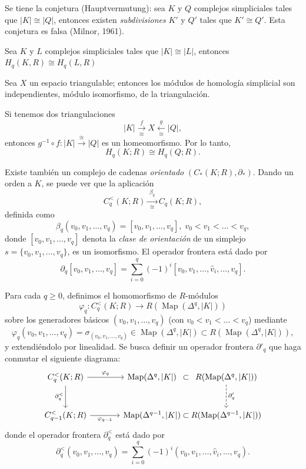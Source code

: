 Se tiene la conjetura (Hauptvermutung): sea $K$ y $Q$ complejos simpliciales tales que $|K|\cong |Q|$, entonces existen \textit{subdivisiones} $K'$ y $Q'$ tales que $K'\cong Q'$. Esta conjetura es falsa (Milnor, 1961).

\begin{teorema}[S.W.Alexander, 1915]
Sea $K$ y $L$ complejos simpliciales tales que $|K|\cong |L|$, entonces $H_q(K,R)\cong H_q(L,R)$ %
\end{teorema}
\begin{coro}
Sea $X$ un espacio triangulable; entonces los módulos de homología simplicial son independientes, módulo isomorfismo, de la triangulación.
\end{coro}

\begin{dem}
Si tenemos dos triangulaciones
\[
|K| \xrightarrow[\;\cong\;]{\;f\;} X \xleftarrow[\;\cong\;]{\;g\;} |Q|,
\]
entonces $g^{-1} \circ f \colon |K| \xrightarrow{\;\cong\;} |Q|$ es un homeomorfismo. Por lo tanto,
\[
H_q(K; R) \cong H_q(Q; R).
\]
\end{dem}
\begin{nota}
Existe también un complejo de cadenas \textit{orientado} $(C_*(K; R), \partial_*)$. Dando un orden a $K$, se puede ver que la aplicación
\[
C_q^<(K; R) \xrightarrow[\;\cong\;]{\;\beta_q\;} C_q(K; R),
\]
definida como
\[
\beta_q(v_0, v_1, \dots, v_q) = [v_0, v_1, \dots, v_q], \; v_0 < v_1 < \dots < v_q,
\]
donde $[v_0, v_1, \dots, v_q]$ denota la \textit{clase de orientación} de un simplejo $s = \{v_0, v_1, \dots, v_q\}$, es un isomorfismo. El operador frontera está dado por
\[
\partial_q[v_0, v_1, \dots, v_q] = \sum_{i=0}^q (-1)^i [v_0, v_1, \dots, \hat{v}_i, \dots, v_q].
\]
\end{nota}
\begin{definicion}
Para cada $q \geq 0$, definimos el homomorfismo de $R$-módulos
\[
\varphi_q \colon C_q^<(K; R) \longrightarrow R(\operatorname{Map}(\Delta^q, |K|))
\]
sobre los generadores básicos $(v_0, v_1, \dots, v_q)$ (con $v_0 < v_1 < \dots < v_q$) mediante
\[
\varphi_q(v_0, v_1, \dots, v_q) = \sigma_{(v_0, v_1, \dots, v_q)} \in \operatorname{Map}(\Delta^q, |K|) \subset R(\operatorname{Map}(\Delta^q, |K|)),
\]
y extendiéndolo por linealidad. Se busca definir un operador frontera $\partial'_q$ que haga conmutar el siguiente diagrama:
\[
\begin{tikzcd}[row sep=large, column sep=large]
C_q^<(K; R) \arrow[r, "\varphi_q"] \arrow[d, "\partial_q^<"'] & \operatorname{Map}(\Delta^q, |K|) \arrow[r, phantom, "\subset"] &[-3.2em] R(\operatorname{Map}(\Delta^q, |K|)) \arrow[d, "\partial'_q", dashed] \\
C_{q-1}^<(K; R) \arrow[r, "\varphi_{q-1}"'] & \operatorname{Map}(\Delta^{q-1}, |K|) \arrow[r, phantom, "\subset"] & R(\operatorname{Map}(\Delta^{q-1}, |K|))
\end{tikzcd}
\]
donde el operador frontera $\partial_q^<$ está dado por
\[
\partial_q^<(v_0, v_1, \dots, v_q) = \sum_{i=0}^q (-1)^i (v_0, v_1, \dots, \hat{v}_i, \dots, v_q).
\]
\end{definicion}
